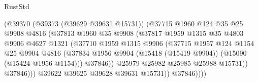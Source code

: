 \begin{lexlean}{RustStd}
\begin{coremodule}
                                      (@39370
                                        (@39373 (@39629 @39631 @15731))
                                        (@37715
                                          @1960
                                          @124
                                          @35
                                          @25
                                          @9908
                                          @4816
                                          (@37813
                                            @1960
                                            @35
                                            @9908
                                            (@37817
                                              @1959
                                              @1315
                                              @35
                                              @4803
                                              @9906
                                              @4627
                                              @1321
                                              (@37710
                                                @1959
                                                @1315
                                                @9906
                                                (@37715
                                                  @1957
                                                  @124
                                                  @1154
                                                  @25
                                                  @9904
                                                  @4816
                                                  (@37834
                                                    @1956
                                                    @9904
                                                    (@15418 (@15419 @9904))
                                                    (@15090 (@15424 @1956 @1154)))
                                                  @37846))
                                              @25979
                                              @25982
                                              @25985
                                              @25988
                                              @15731))
                                          @37846)))
                                    @39622
                                    @39625
                                    @39628
                                    @39631
                                    @15731))
                                @37846))))

\end{coremodule}
\end{lexlean}
